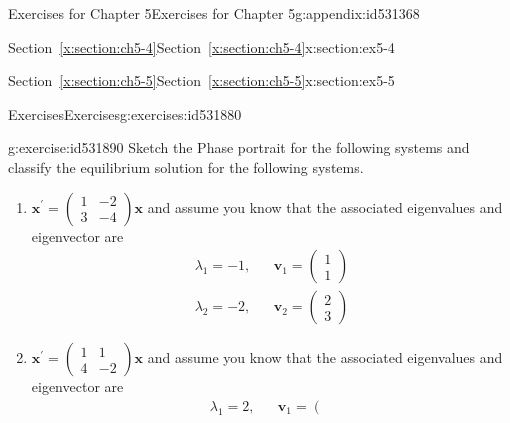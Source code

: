\documentclass[oneside,10pt,]{book}
\newcommand{\xreffont}{\relax}
\numberwithin{equation}{section}
\numberwithin{equation}{section}
\newcommand{\amp}{&}
\begin{document}
\begin{appendixptx}{Exercises for Chapter 5}{}{Exercises for Chapter 5}{}{}{g:appendix:id531368}
\begin{sectionptx}{Section~{\xreffont\ref*{x:section:ch5-4}}}{}{Section~{\xreffont\ref*{x:section:ch5-4}}}{}{}{x:section:ex5-4}
\end{sectionptx}
%
%
\typeout{************************************************}
\typeout{Section F.5 Section~{\xreffont\ref*{x:section:ch5-5}}}
\typeout{************************************************}
%
\begin{sectionptx}{Section~{\xreffont\ref*{x:section:ch5-5}}}{}{Section~{\xreffont\ref*{x:section:ch5-5}}}{}{}{x:section:ex5-5}
%
%
\typeout{************************************************}
\typeout{************************************************}
%
\begin{exercises-subsection-numberless}{Exercises}{}{Exercises}{}{}{g:exercises:id531880}
\begin{divisionexercise}{1}{}{}{g:exercise:id531890}%
Sketch the Phase portrait for the following systems and classify the equilibrium solution for the following systems.%
%
\begin{enumerate}[label=(\alph*)]
\item{}\({\displaystyle \mathbf{x}^{\prime}=\left(\begin{array}{cc}
1 \amp -2\\
3 \amp -4
\end{array}\right)\mathbf{x}}\) and assume you know that the associated eigenvalues and eigenvector are%
\begin{equation*}
\begin{array}{ccc}
\lambda_{1}=-1, \amp  \amp \mathbf{v}_{1}=\left(\begin{array}{c}
1\\
1
\end{array}\right)\\
\lambda_{2}=-2, \amp  \amp \mathbf{v}_{2}=\left(\begin{array}{c}
2\\
3
\end{array}\right)
\end{array}
\end{equation*}
%
\item{}\({\displaystyle \mathbf{x}^{\prime}=\left(\begin{array}{cc}
1 \amp 1\\
4 \amp -2
\end{array}\right)\mathbf{x}}\) and assume you know that the associated eigenvalues and eigenvector are%
\begin{equation*}
\begin{array}{ccc}
\lambda_{1}=2, \amp  \amp \mathbf{v}_{1}=\left(\begin{array}{c}

\end{array}
\end{array}
\end{equation*}
\end{enumerate}
\end{divisionexercise}
\end{exercises-subsection-numberless}
\end{sectionptx}
\end{appendixptx}
\end{document}
